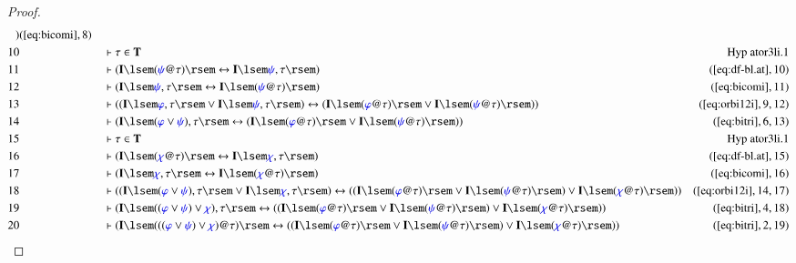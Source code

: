 \begin{proof}
\begin{align}
      )&(\mbox{\ref{eq:bicomi}},8)\notag
  \\ 10 &&  & \vdash \tau \in
      \mathbf{T}&\text{Hyp~ator3li.1}\notag
  \\ 11 &&  & \vdash ( \mathbf{I} \lsem ( \mw{\psi} @ \tau ) \rsem
      \leftrightarrow \mathbf{I} \lsem \mw{\psi} , \tau \rsem
      )&(\mbox{\ref{eq:df-bl.at}},10)\notag
  \\ 12 &&  & \vdash ( \mathbf{I} \lsem \mw{\psi} , \tau \rsem
      \leftrightarrow \mathbf{I} \lsem ( \mw{\psi} @ \tau ) \rsem
      )&(\mbox{\ref{eq:bicomi}},11)\notag
  \\ 13 &&  & \vdash ( ( \mathbf{I} \lsem \mw{\varphi} , \tau \rsem
      \vee \mathbf{I} \lsem \mw{\psi} , \tau \rsem ) \leftrightarrow (
      \mathbf{I} \lsem ( \mw{\varphi} @ \tau ) \rsem \vee \mathbf{I}
      \lsem ( \mw{\psi} @ \tau ) \rsem )
      )&(\mbox{\ref{eq:orbi12i}},9,12)\notag
  \\ 14 &&  & \vdash ( \mathbf{I} \lsem ( \mw{\varphi} \vee \mw{\psi}
      ) , \tau \rsem \leftrightarrow ( \mathbf{I} \lsem ( \mw{\varphi}
      @ \tau ) \rsem \vee \mathbf{I} \lsem ( \mw{\psi} @ \tau ) \rsem
      ) )&(\mbox{\ref{eq:bitri}},6,13)\notag
  \\ 15 &&  & \vdash \tau \in
      \mathbf{T}&\text{Hyp~ator3li.1}\notag
  \\ 16 &&  & \vdash ( \mathbf{I} \lsem ( \mw{\chi} @ \tau ) \rsem
      \leftrightarrow \mathbf{I} \lsem \mw{\chi} , \tau \rsem
      )&(\mbox{\ref{eq:df-bl.at}},15)\notag
  \\ 17 &&  & \vdash ( \mathbf{I} \lsem \mw{\chi} , \tau \rsem
      \leftrightarrow \mathbf{I} \lsem ( \mw{\chi} @ \tau ) \rsem
      )&(\mbox{\ref{eq:bicomi}},16)\notag
  \\ 18 &&  & \vdash ( ( \mathbf{I} \lsem ( \mw{\varphi} \vee \mw{\psi}
      ) , \tau \rsem \vee \mathbf{I} \lsem \mw{\chi} , \tau \rsem )
      \leftrightarrow ( ( \mathbf{I} \lsem ( \mw{\varphi} @ \tau )
      \rsem \vee \mathbf{I} \lsem ( \mw{\psi} @ \tau ) \rsem ) \vee
      \mathbf{I} \lsem ( \mw{\chi} @ \tau ) \rsem )
      )&(\mbox{\ref{eq:orbi12i}},14,17)\notag
  \\ 19 &&  & \vdash ( \mathbf{I} \lsem ( ( \mw{\varphi} \vee
      \mw{\psi} ) \vee \mw{\chi} ) , \tau \rsem \leftrightarrow ( (
      \mathbf{I} \lsem ( \mw{\varphi} @ \tau ) \rsem \vee \mathbf{I}
      \lsem ( \mw{\psi} @ \tau ) \rsem ) \vee \mathbf{I} \lsem (
      \mw{\chi} @ \tau ) \rsem ) )&(\mbox{\ref{eq:bitri}},4,18)\notag
  \\ 20 &&  & \vdash ( \mathbf{I} \lsem ( ( ( \mw{\varphi} \vee
      \mw{\psi} ) \vee \mw{\chi} ) @ \tau ) \rsem \leftrightarrow ( (
      \mathbf{I} \lsem ( \mw{\varphi} @ \tau ) \rsem \vee \mathbf{I}
      \lsem ( \mw{\psi} @ \tau ) \rsem ) \vee \mathbf{I} \lsem (
      \mw{\chi} @ \tau ) \rsem ) )&(\mbox{\ref{eq:bitri}},2,19)\notag
\end{align}
\end{proof}


